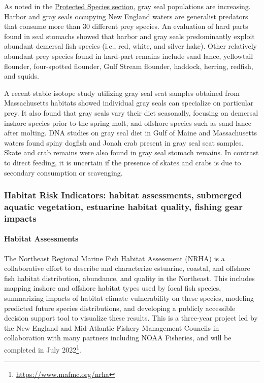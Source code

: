 \documentclass[
  10pt,
]{article}
\begin{document}
As noted in the \protect\hyperlink{protected-species}{Protected Species
section}, gray seal populations are increasing. Harbor and gray seals
occupying New England waters are generalist predators that consume more
than 30 different prey species. An evaluation of hard parts found in
seal stomachs showed that harbor and gray seals predominantly exploit
abundant demersal fish species (i.e., red, white, and silver hake).
Other relatively abundant prey species found in hard-part remains
include sand lance, yellowtail flounder, four-spotted flounder, Gulf
Stream flounder, haddock, herring, redfish, and squids.

A recent stable isotope study utilizing gray seal scat samples obtained
from Massachusetts habitats showed individual gray seals can specialize
on particular prey. It also found that gray seals vary their diet
seasonally, focusing on demersal inshore species prior to the spring
molt, and offshore species such as sand lance after molting. DNA studies
on gray seal diet in Gulf of Maine and Massachusetts waters found spiny
dogfish and Jonah crab present in gray seal scat samples. Skate and crab
remains were also found in gray seal stomach remains. In contrast to
direct feeding, it is uncertain if the presence of skates and crabs is
due to secondary consumption or scavenging.

\hypertarget{habitat-risk-indicators-habitat-assessments-submerged-aquatic-vegetation-estuarine-habitat-quality-fishing-gear-impacts}{%
\subsubsection{Habitat Risk Indicators: habitat assessments, submerged
aquatic vegetation, estuarine habitat quality, fishing gear
impacts}\label{habitat-risk-indicators-habitat-assessments-submerged-aquatic-vegetation-estuarine-habitat-quality-fishing-gear-impacts}}

\hypertarget{habitat-assessments}{%
\paragraph{Habitat Assessments}\label{habitat-assessments}}

The Northeast Regional Marine Fish Habitat Assessment (NRHA) is a
collaborative effort to describe and characterize estuarine, coastal,
and offshore fish habitat distribution, abundance, and quality in the
Northeast. This includes mapping inshore and offshore habitat types used
by focal fish species, summarizing impacts of habitat climate
vulnerability on these species, modeling predicted future species
distributions, and developing a publicly accessible decision support
tool to visualize these results. This is a three-year project led by the
New England and Mid-Atlantic Fishery Management Councils in
collaboration with many partners including NOAA Fisheries, and will be
completed in July 2022\footnote{\url{https://www.mafmc.org/nrha}}.
\end{document}
